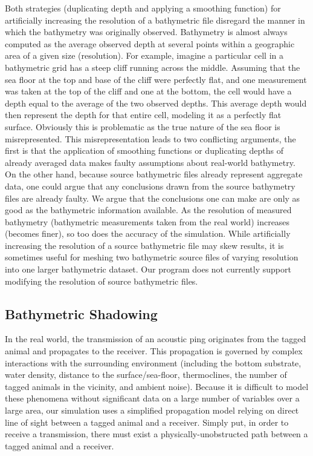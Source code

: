 Both strategies (duplicating depth and applying a smoothing function) for artificially increasing the resolution of a bathymetric file disregard the manner in which the bathymetry was originally observed.  Bathymetry is almost always computed as the average observed depth at several points within a geographic area of a given size (resolution).  For example, imagine a particular cell in a bathymetric grid has a steep cliff running across the middle.  Assuming that the sea floor at the top and base of the cliff were perfectly flat, and one measurement was taken at the top of the cliff and one at the bottom, the cell would have a depth equal to the average of the two observed depths.  This average depth would then represent the depth for that entire cell, modeling it as a perfectly flat surface.  Obviously this is problematic as the true nature of the sea floor is misrepresented.  This misrepresentation leads to two conflicting arguments, the first is that the application of smoothing functions or duplicating depths of already averaged data makes faulty assumptions about real-world bathymetry.  On the other hand, because source bathymetric files already represent aggregate data, one could argue that any conclusions drawn from the source bathymetry files are already faulty.  We argue that the conclusions one can make are only as good as the bathymetric information available.  As the resolution of measured bathymetry (bathymetric measurements taken from the real world) increases (becomes finer), so too does the accuracy of the simulation.  While artificially increasing the resolution of a source bathymetric file may skew results, it is sometimes useful for meshing two bathymetric source files of varying resolution into one larger bathymetric dataset.  Our program does not currently support modifying the resolution of source bathymetric files.


\subsection{Bathymetric Shadowing}
\label{bathymetricShadowing}
In the real world, the transmission of an acoustic ping originates from the tagged animal and propagates to the receiver.  This propagation is governed by complex interactions with the surrounding environment (including the bottom substrate, water density, distance to the surface/sea-floor, thermoclines, the number of tagged animals in the vicinity, and ambient noise).  Because it is difficult to model these phenomena without significant data on a large number of variables over a large area, our simulation uses a simplified propagation model relying on direct line of sight between a tagged animal and a receiver.  Simply put, in order to receive a transmission, there must exist a physically-unobstructed path between a tagged animal and a receiver.  



